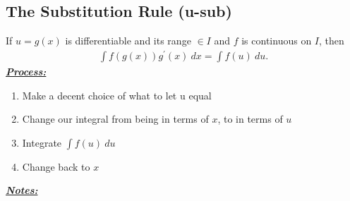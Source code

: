 \documentclass{report}
\begin{document}
      \subsection{The Substitution Rule (u-sub)}
      \bigbreak \noindent \bigbreak \noindent
      If $u=g(x)$ is differentiable and its range $\in I $ and $f $ is continuous on $I$, then
      \begin{align*}
        \int f(g(x))g^{\prime}(x)\ dx = \int f(u)\ du
      .\end{align*}
      \bigbreak \noindent \bigbreak \noindent
      \textbf{\textit{\underline{Process:}}}
      \begin{enumerate}
        \item Make a decent choice of what to let u equal
        \item Change our integral from being in terms of $x$, to in terms of $u$
        \item Integrate $\int f(u)\ du $
        \item Change back to $x$
      \end{enumerate}
      \bigbreak \noindent \bigbreak \noindent
      \bigbreak \noindent \bigbreak \noindent
      \textbf{\textit{\underline{Notes:}}}
\end{document}
